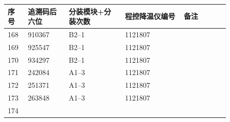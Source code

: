 \documentclass[UTF8,10pt,a4paper,fontset=fandol]{ctexart}
\newcommand{\fieldvalue}[1]{#1}
\begin{document}
\small
\begin{tabular}{|p{0.07\linewidth}|p{0.16\linewidth}|p{0.22\linewidth}|p{0.23\linewidth}|p{0.18\linewidth}|}
\hline
序号 & 追溯码后六位 & 分装模块+分装次数 & 程控降温仪编号 & 备注 \\
\hline
\fieldvalue{168} &
\fieldvalue{910367} &
\fieldvalue{B2--1} &
\fieldvalue{1121807} & \\
\hline
\fieldvalue{169} &
\fieldvalue{925547} &
\fieldvalue{B2--1} &
\fieldvalue{1121807} & \\
\hline
\fieldvalue{170} &
\fieldvalue{934297} &
\fieldvalue{B2--1} &
\fieldvalue{1121807} & \\
\hline
\fieldvalue{171} &
\fieldvalue{242084} &
\fieldvalue{A1--3} &
\fieldvalue{1121807} & \\
\hline
\fieldvalue{172} &
\fieldvalue{251371} &
\fieldvalue{A1--3} &
\fieldvalue{1121807} & \\
\hline
\fieldvalue{173} &
\fieldvalue{263848} &
\fieldvalue{A1--3} &
\fieldvalue{1121807} & \\
\hline
\fieldvalue{174} &

\end{tabular}
\end{document}

